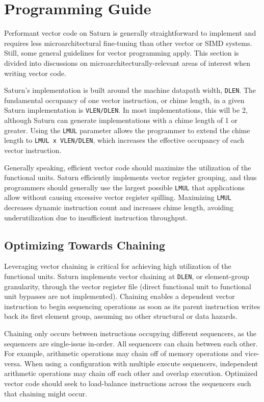 \newpage
\section{Programming Guide}
\label{sec:programming}

Performant vector code on Saturn is generally straightforward to implement and requires less microarchitectural fine-tuning than other vector or SIMD systems.
Still, some general guidelines for vector programming apply.
This section is divided into discussions on microarchitecturally-relevant areas of interest when writing vector code.


Saturn's implementation is built around the machine datapath width, \texttt{DLEN}.
The fundamental occupancy of one vector instruction, or chime length, in a given Saturn implementation is \texttt{VLEN/DLEN}.
In most implementations, this will be 2, although Saturn can generate implementations with a chime length of 1 or greater.
Using the \texttt{LMUL} parameter allows the programmer to extend the chime length to \texttt{LMUL x VLEN/DLEN}, which increases the effective occupancy of each vector instruction.

Generally speaking, efficient vector code should maximize the utilization of the functional units.
Saturn efficiently implements vector register grouping, and thus programmers should generally use the largest possible \texttt{LMUL} that applications allow without causing excessive vector register spilling.
Maximizing \texttt{LMUL} decreases dynamic instruction count and increases chime length, avoiding underutilization due to insufficient instruction throughput.

\subsection{Optimizing Towards Chaining}

Leveraging vector chaining is critical for achieving high utilization of the functional units.
Saturn implements vector chaining at \texttt{DLEN}, or element-group granularity, through the vector register file (direct functional unit to functional unit bypasses are not implemented).
Chaining enables a dependent vector instruction to begin sequencing operations as soon as its parent instruction writes back its first element group, assuming no other structural or data hazards.

Chaining only occurs between instructions occupying different sequencers, as the sequencers are single-issue in-order.
All sequencers can chain between each other.
For example, arithmetic operations may chain off of memory operations and vice-versa.
When using a configuration with multiple execute sequencers, independent arithmetic operations may chain off each other and overlap execution.
Optimized vector code should seek to load-balance instructions across the sequencers such that chaining might occur.


